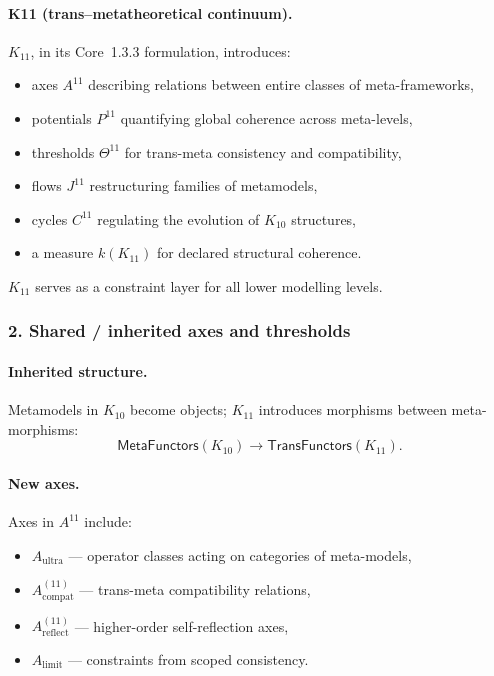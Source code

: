 \paragraph{K11 (trans–metatheoretical continuum).}
$K_{11}$, in its Core~1.3.3 formulation, introduces:
\begin{itemize}
  \item axes $A^{11}$ describing relations between entire classes of
        meta-frameworks,
  \item potentials $P^{11}$ quantifying global coherence across meta-levels,
  \item thresholds $\Theta^{11}$ for trans-meta consistency and
        compatibility,
  \item flows $J^{11}$ restructuring families of metamodels,
  \item cycles $C^{11}$ regulating the evolution of $K_{10}$ structures,
  \item a measure $k(K_{11})$ for declared structural coherence.
\end{itemize}

$K_{11}$ serves as a constraint layer for all lower modelling levels.

\subsubsection{2. Shared / inherited axes and thresholds}

\paragraph{Inherited structure.}
Metamodels in $K_{10}$ become objects; $K_{11}$ introduces morphisms between
meta-morphisms:
\[
\mathsf{MetaFunctors}(K_{10}) \rightarrow \mathsf{TransFunctors}(K_{11}).
\]

\paragraph{New axes.}
Axes in $A^{11}$ include:
\begin{itemize}
  \item $A_{\mathrm{ultra}}$ — operator classes acting on categories of
        meta-models,
  \item $A_{\mathrm{compat}}^{(11)}$ — trans-meta compatibility relations,
  \item $A_{\mathrm{reflect}}^{(11)}$ — higher-order self-reflection axes,
  \item $A_{\mathrm{limit}}$ — constraints from scoped consistency.
\end{itemize}

